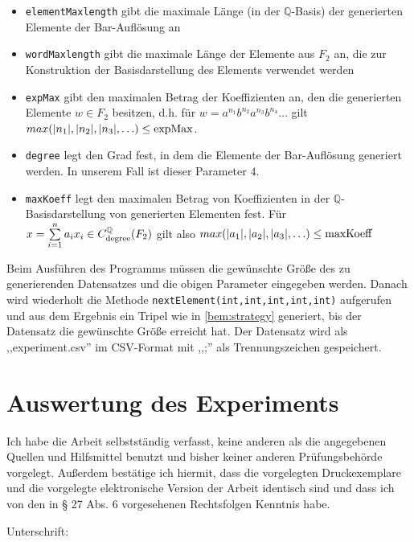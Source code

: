 \documentclass[a4paper,twoside,10pt]{scrreprt}
\newcommand{\Q}{\mathbb{Q}}
\theoremstyle{definition}
\begin{document}
\begin{itemize}
\begin{itemize}
\item \lstinline|elementMaxlength| gibt die maximale Länge (in der $\Q$-Basis) der generierten Elemente der Bar-Auflösung an
\item \lstinline|wordMaxlength| gibt die maximale Länge der Elemente aus $F_2$ an, die zur Konstruktion der Basisdarstellung des Elements verwendet werden
\item \lstinline|expMax| gibt den maximalen Betrag der Koeffizienten an, den die generierten Elemente $w\in F_2$ besitzen, d.h. für $w=a^{n_1}b^{n_2}a^{n_3}b^{n_4}\ldots$ gilt $max(|n_1|,|n_2|,\\|n_3|,\ldots)\leq \text{\lstinline|expMax|}$.
\item \lstinline|degree| legt den Grad fest, in dem die Elemente der Bar-Auflösung generiert werden. In unserem Fall ist dieser Parameter $4$.
\item \lstinline|maxKoeff| legt den maximalen Betrag von Koeffizienten in der $\Q$-Basis\-darstellung von generierten Elementen fest. Für $x=\sum\limits_{i=1}^na_ix_i\in C_{\text{\lstinline|degree|}}^{\Q}(F_2)$ gilt also $max(|a_1|,|a_2|,|a_3|,\ldots)\leq \text{\lstinline|maxKoeff|}$
\end{itemize}
\end{itemize}
Beim Ausführen des Programms müssen die gewünschte Größe des zu generierenden Datensatzes und die obigen Parameter eingegeben werden. Danach wird wiederholt die Methode \lstinline|nextElement(int,int,int,int,int)| aufgerufen und aus dem Ergebnis ein Tripel wie in \cref{bem:strategy} generiert, bis der Datensatz die gewünschte Größe erreicht hat. Der Datensatz wird als ,,experiment.csv'' im CSV-Format mit ,,;'' als Trennungszeichen gespeichert.
\chapter{Auswertung des Experiments}

\nocite{loeha}
\nocite{loehb}
\nocite{frigerio}
\printbibliography
\newpage
\cleardoublepage
\pagestyle{empty}
\noindent
Ich habe die Arbeit selbstständig verfasst, keine anderen als die angegebenen Quellen und Hilfsmittel benutzt und bisher keiner anderen Prüfungsbehörde vorgelegt. Außerdem bestätige ich hiermit, dass die vorgelegten Druckexemplare und die vorgelegte elektronische Version der Arbeit identisch sind und dass ich von den in § 27 Abs. 6 vorgesehenen Rechtsfolgen Kenntnis habe.\par\hfill\par\noindent
Unterschrift:\hspace{0.5cm} \makebox[1.5in]{\hrulefill}
\end{document}
